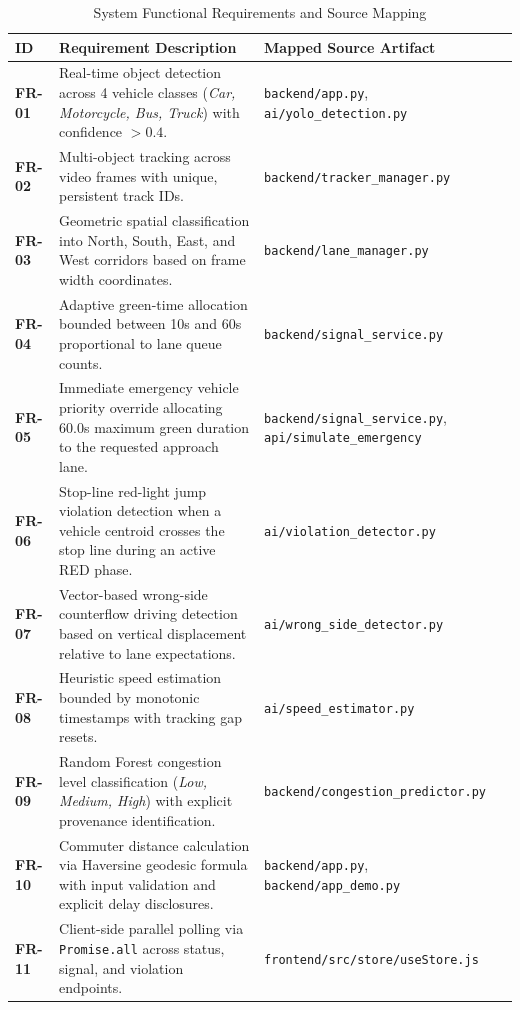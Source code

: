 \documentclass[11pt,a4paper,oneside]{report}
\begin{document}
\begin{table}[h!]
\centering
\small
\begin{tabularx}{\textwidth}{l p{7.5cm} X}
\toprule
\textbf{ID} & \textbf{Requirement Description} & \textbf{Mapped Source Artifact} \\
\midrule
\textbf{FR-01} & Real-time object detection across 4 vehicle classes (\textit{Car, Motorcycle, Bus, Truck}) with confidence $> 0.4$. & \texttt{backend/app.py}, \texttt{ai/yolo\_detection.py} \\
\textbf{FR-02} & Multi-object tracking across video frames with unique, persistent track IDs. & \texttt{backend/tracker\_manager.py} \\
\textbf{FR-03} & Geometric spatial classification into North, South, East, and West corridors based on frame width coordinates. & \texttt{backend/lane\_manager.py} \\
\textbf{FR-04} & Adaptive green-time allocation bounded between 10s and 60s proportional to lane queue counts. & \texttt{backend/signal\_service.py} \\
\textbf{FR-05} & Immediate emergency vehicle priority override allocating 60.0s maximum green duration to the requested approach lane. & \texttt{backend/signal\_service.py}, \texttt{api/simulate\_emergency} \\
\textbf{FR-06} & Stop-line red-light jump violation detection when a vehicle centroid crosses the stop line during an active RED phase. & \texttt{ai/violation\_detector.py} \\
\textbf{FR-07} & Vector-based wrong-side counterflow driving detection based on vertical displacement relative to lane expectations. & \texttt{ai/wrong\_side\_detector.py} \\
\textbf{FR-08} & Heuristic speed estimation bounded by monotonic timestamps with tracking gap resets. & \texttt{ai/speed\_estimator.py} \\
\textbf{FR-09} & Random Forest congestion level classification (\textit{Low, Medium, High}) with explicit provenance identification. & \texttt{backend/congestion\_predictor.py} \\
\textbf{FR-10} & Commuter distance calculation via Haversine geodesic formula with input validation and explicit delay disclosures. & \texttt{backend/app.py}, \texttt{backend/app\_demo.py} \\
\textbf{FR-11} & Client-side parallel polling via \texttt{Promise.all} across status, signal, and violation endpoints. & \texttt{frontend/src/store/useStore.js} \\
\bottomrule
\end{tabularx}
\caption{System Functional Requirements and Source Mapping}
\label{tab:functional_requirements}
\end{table}
\end{document}
